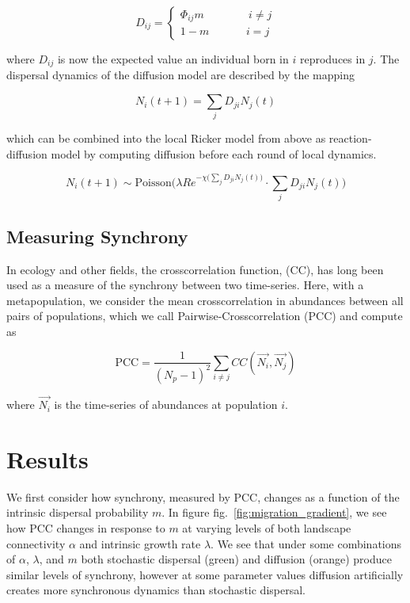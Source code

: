 \documentclass[10pt,oneside]{article}
\begin{document}
\[D_{ij} = \begin{cases} \Phi_{ij}m \quad\quad\quad &\ i \neq j \\ 1-m
& i=j \end{cases}\]

where \(D_{ij}\) is now the expected value an individual born in \(i\)
reproduces in \(j\). The dispersal dynamics of the diffusion model are
described by the mapping

\[N_i(t+1) = \sum_j D_{ji} N_j(t)\]

which can be combined into the local Ricker model from above as
reaction-diffusion model by computing diffusion before each round of
local dynamics.

\[N_i(t+1) \sim \text{Poisson}\bigg( \lambda R e^{-\chi \big(\sum_j
D_{ji} N_j(t)\big)} \cdot \sum_j D_{ji} N_j(t) \bigg)\]

\hypertarget{measuring-synchrony}{%
\subsection{Measuring Synchrony}\label{measuring-synchrony}}

In ecology and other fields, the crosscorrelation function, (CC), has
long been used as a measure of the synchrony between two time-series.
Here, with a metapopulation, we consider the mean crosscorrelation in
abundances between all pairs of populations, which we call
Pairwise-Crosscorrelation (\(\text{PCC}\)) and compute as

\[\text{PCC}=\frac{1}{(N_p-1)^2}\sum_{i \neq j} CC(\vec{N_i},\vec{N_j})\]

where \(\vec{N_i}\) is the time-series of abundances at population
\(i\).

\hypertarget{results}{%
\section{Results}\label{results}}

We first consider how synchrony, measured by \(\text{PCC}\), changes as
a function of the intrinsic dispersal probability \(m\). In figure
fig.~\ref{fig:migration_gradient}, we see how \(\text{PCC}\) changes in
response to \(m\) at varying levels of both landscape connectivity
\(\alpha\) and intrinsic growth rate \(\lambda\). We see that under some
combinations of \(\alpha\), \(\lambda\), and \(m\) both stochastic
dispersal (green) and diffusion (orange) produce similar levels of
synchrony, however at some parameter values diffusion artificially
creates more synchronous dynamics than stochastic dispersal.
\end{document}
